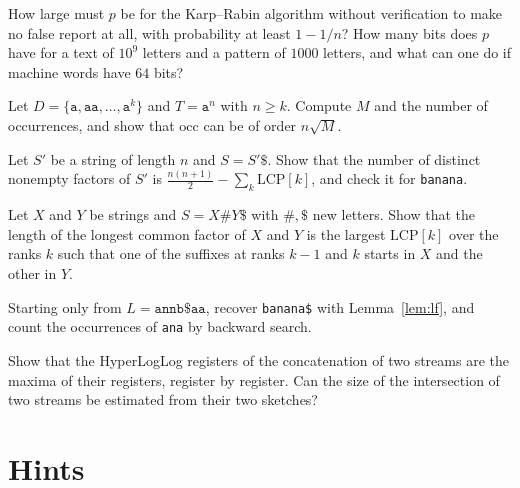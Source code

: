 \begin{exercise}[$\star$]\label{ex:krprime}
How large must $p$ be for the Karp--Rabin algorithm without verification to make no false report at all, with probability at least $1-1/n$? How many bits does $p$ have for a text of $10^9$ letters and a pattern of $1000$ letters, and what can one do if machine words have $64$ bits?
\end{exercise}

\begin{exercise}[$\star$]\label{ex:ahooutputs}
Let $D=\{\texttt{a},\texttt{aa},\dots,\texttt{a}^k\}$ and $T=\texttt{a}^n$ with $n\ge k$. Compute $M$ and the number of occurrences, and show that $\mathrm{occ}$ can be of order $n\sqrt M$.
\end{exercise}

\begin{exercise}[$\star\star$]\label{ex:distinctsub}
Let $S'$ be a string of length $n$ and $S=S'\$$. Show that the number of distinct nonempty factors of $S'$ is $\frac{n(n+1)}2-\sum_{k}\mathrm{LCP}[k]$, and check it for \texttt{banana}.
\end{exercise}

\begin{exercise}[$\star\star$]\label{ex:lcsubstring}
Let $X$ and $Y$ be strings and $S=X\#Y\$$ with $\#,\$$ new letters. Show that the length of the longest common factor of $X$ and $Y$ is the largest $\mathrm{LCP}[k]$ over the ranks $k$ such that one of the suffixes at ranks $k-1$ and $k$ starts in $X$ and the other in $Y$.
\end{exercise}

\begin{exercise}[$\star$]\label{ex:bwtbanana}
Starting only from $L=\texttt{annb\$aa}$, recover \texttt{banana\$} with Lemma~\ref{lem:lf}, and count the occurrences of \texttt{ana} by backward search.
\end{exercise}

\begin{exercise}[$\star$]\label{ex:hllmerge}
Show that the HyperLogLog registers of the concatenation of two streams are the maxima of their registers, register by register. Can the size of the intersection of two streams be estimated from their two sketches?
\end{exercise}

\section{Hints}

